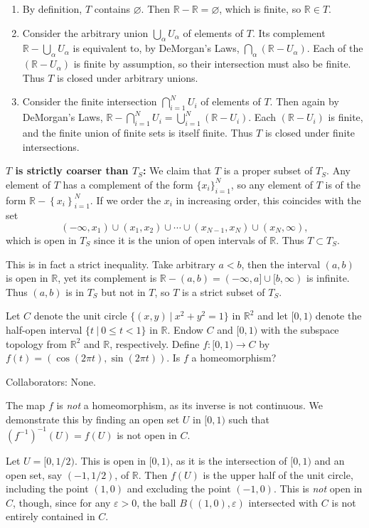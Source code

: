 \documentclass[11pt]{article}
\begin{document}
\begin{enumerate}
	\item By definition, $T$ contains $\varnothing$. Then $\mathbb{R}-\mathbb{R}=\varnothing$, which is finite, so $\mathbb{R} \in T$.
	\item Consider the arbitrary union $\bigcup_{\alpha}U_\alpha$ of elements of $T$. Its complement $\mathbb{R}-\bigcup_{\alpha}U_\alpha$ is equivalent to, by DeMorgan's Laws, $\bigcap_{\alpha}(\mathbb{R}-U_{\alpha})$. Each of the $(\mathbb{R}-U_{\alpha})$ is finite by assumption, so their intersection must also be finite. Thus $T$ is closed under arbitrary unions.
	\item Consider the finite intersection $\bigcap_{i=1}^N U_i$ of elements of $T$. Then again by DeMorgan's Laws, $\mathbb{R}-\bigcap_{i=1}^N U_i=\bigcup_{i=1}^N (\mathbb{R}-U_i)$. Each $(\mathbb{R}-U_i)$ is finite, and the finite union of finite sets is itself finite. Thus $T$ is closed under finite intersections.
\end{enumerate}
\textbf{$T$ is strictly coarser than $T_S$:} We claim that $T$ is a proper subset of $T_S$. Any element of $T$ has a complement of the form $\{x_i\}_{i=1}^N$, so any element of $T$ is of the form $\mathbb{R}-\left\{ x_i \right\}_{i=1}^N$. If we order the $x_i$ in increasing order, this coincides with the set
\[
	(-\infty, x_1) \cup (x_1, x_2) \cup \cdots \cup (x_{N-1},x_N) \cup (x_N, \infty),
\] which is open in $T_S$ since it is the union of open intervals of $\mathbb{R}$. Thus $T \subset T_S$.

This is in fact a strict inequality. Take arbitrary $a < b$, then the interval $(a,b)$ is open in $\mathbb{R}$, yet its complement is $\mathbb{R}-(a,b) = (-\infty,a] \cup [b,\infty)$ is infinite. Thus $(a,b)$ is in $T_S$ but not in $T$, so $T$ is a strict subset of $T_S$.

\begin{exer}[5 points]
	Let $C$ denote the unit circle $\{(x, y)\ |\ x^2 + y^2=1 \}$ in $\mathbb{R}^2$ and let $[0, 1)$ denote the half-open interval $\{t\ |\ 0 \leq t < 1 \}$ in $\mathbb{R}$. Endow $C$ and $[0, 1)$ with the subspace topology from $\mathbb{R}^2$ and $\mathbb{R}$, respectively. Define $f: [0, 1) \to C$ by $f(t) = (\cos(2\pi t), \sin(2\pi t))$. Is $f$ a homeomorphism?
\end{exer}
{\color{blue}Collaborators: None.}

The map $f$ is \textit{not} a homeomorphism, as its inverse is not continuous. We demonstrate this by finding an open set $U$ in $[0, 1)$ such that $(f^{-1})^{-1}(U) = f(U)$ is not open in $C$.

Let $U = [0, 1/2)$. This is open in $[0, 1)$, as it is the intersection of $[0,1)$ and an open set, say $(-1, 1/2)$, of $\mathbb{R}$. Then $f(U)$ is the upper half of the unit circle, including the point $(1, 0)$ and excluding the point $(-1, 0)$. This is \textit{not} open in $C$, though, since for any $\varepsilon > 0$, the ball $B( (1,0), \varepsilon)$ intersected with $C$ is not entirely contained in $C$.
\end{document}
